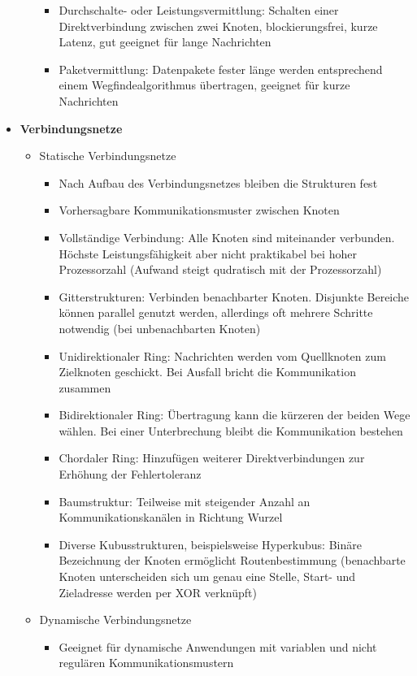 \begin{itemize}
\begin{itemize}
		\begin{itemize}
			\item Durchschalte- oder Leistungsvermittlung: Schalten einer Direktverbindung zwischen zwei Knoten, blockierungsfrei, kurze Latenz, gut geeignet für lange Nachrichten
			\item Paketvermittlung: Datenpakete fester länge werden entsprechend einem Wegfindealgorithmus übertragen, geeignet für kurze Nachrichten
		\end{itemize}
	\end{itemize}
	\item \textbf{Verbindungsnetze}
	\begin{itemize}
		\item Statische Verbindungsnetze
		\begin{itemize}
			\item Nach Aufbau des Verbindungsnetzes bleiben die Strukturen fest
			\item Vorhersagbare Kommunikationsmuster zwischen Knoten
			\item Vollständige Verbindung: Alle Knoten sind miteinander verbunden. Höchste Leistungsfähigkeit aber nicht praktikabel bei hoher Prozessorzahl (Aufwand steigt qudratisch mit der Prozessorzahl)
			\item Gitterstrukturen: Verbinden benachbarter Knoten. Disjunkte Bereiche können parallel genutzt werden, allerdings oft mehrere Schritte notwendig (bei unbenachbarten Knoten)
			\item Unidirektionaler Ring: Nachrichten werden vom Quellknoten zum Zielknoten geschickt. Bei Ausfall bricht die Kommunikation zusammen
			\item Bidirektionaler Ring: Übertragung kann die kürzeren der beiden Wege wählen. Bei einer Unterbrechung bleibt die Kommunikation bestehen
			\item Chordaler Ring: Hinzufügen weiterer Direktverbindungen zur Erhöhung der Fehlertoleranz
			\item Baumstruktur: Teilweise mit steigender Anzahl an Kommunikationskanälen in Richtung Wurzel
			\item Diverse Kubusstrukturen, beispielsweise Hyperkubus: Binäre Bezeichnung der Knoten ermöglicht Routenbestimmung (benachbarte Knoten unterscheiden sich um genau eine Stelle, Start- und Zieladresse werden per XOR verknüpft)
		\end{itemize}
		\item Dynamische Verbindungsnetze
		\begin{itemize}
			\item Geeignet für dynamische Anwendungen mit variablen und nicht regulären Kommunikationsmustern

\end{itemize}
\end{itemize}
\end{itemize}
